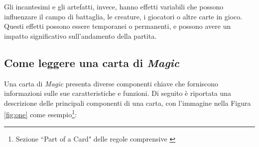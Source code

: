 Gli incantesimi e gli artefatti, invece, hanno effetti variabili che possono influenzare il campo di battaglia, le creature, i giocatori o altre carte in gioco. Questi effetti possono essere temporanei o permanenti, e possono avere un impatto significativo sull'andamento della partita.

\subsection{Come leggere una carta di \emph{Magic}}\label{subsec:mtg_cards}
Una carta di \emph{Magic} presenta diverse componenti chiave che forniscono informazioni sulle sue caratteristiche e funzioni. Di seguito è riportata una descrizione delle principali componenti di una carta, con l'immagine nella Figura \ref{fig:one} come esempio\footnote{ Sezione ``Part of a Card" delle regole comprensive \cite{mtg-comp-rules}}:



